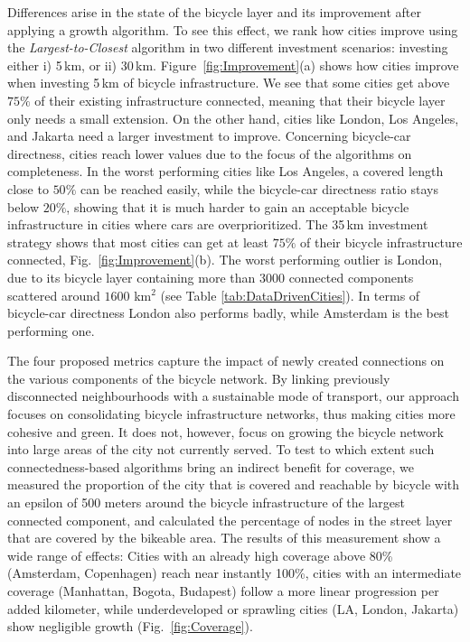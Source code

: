 Differences arise in the state of the bicycle layer and its improvement after applying a growth algorithm. To see this effect, we rank how cities improve using the \textit{Largest-to-Closest} algorithm in two different investment scenarios: investing either i) 5\,km, or ii) 30\,km. Figure~\ref{fig:Improvement}(a) shows how cities improve when investing 5\,km of bicycle infrastructure. We see that some cities get above $75\%$ of their existing infrastructure connected, meaning that their bicycle layer only needs a small extension. On the other hand, cities like London, Los Angeles, and Jakarta need a larger investment to improve. Concerning bicycle-car directness, cities reach lower values due to the focus of the algorithms on completeness. In the worst performing cities like Los Angeles, a covered length close to $50\%$ can be reached easily, while the bicycle-car directness ratio stays below $20\%$, showing that it is much harder to gain an acceptable bicycle infrastructure in cities where cars are overprioritized. The 35\,km investment strategy shows that most cities can get at least $75\%$ of their bicycle infrastructure connected, Fig.~\ref{fig:Improvement}(b). The worst performing outlier is London, due to its bicycle layer containing more than 3000 connected components scattered around $1600$ km$^2$ (see Table \ref{tab:DataDrivenCities}). In terms of bicycle-car directness London also performs badly, while Amsterdam is the best performing one.

The four proposed metrics capture the impact of newly created connections on the various components of the bicycle network. By linking previously disconnected neighbourhoods with a sustainable mode of transport, our approach focuses on consolidating bicycle infrastructure networks, thus making cities more cohesive and green. It does not, however, focus on growing the bicycle network into large areas of the city not currently served. To test to which extent such connectedness-based algorithms bring an indirect benefit for coverage, we measured the proportion of the city that is covered and reachable by bicycle with an epsilon of 500 meters around the bicycle infrastructure of the largest connected component, and calculated the percentage of nodes in the street layer that are covered by the bikeable area. The results of this measurement show a wide range of effects: Cities with an already high coverage above 80\% (Amsterdam, Copenhagen) reach near instantly 100\%, cities with an intermediate coverage (Manhattan, Bogota, Budapest) follow a more linear progression per added kilometer, while underdeveloped or sprawling cities (LA, London, Jakarta) show negligible growth (Fig.~\ref{fig:Coverage}).

